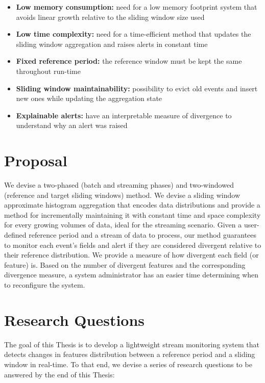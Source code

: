 \begin{itemize}
    \item \textbf{Low memory consumption:} need for a low memory footprint system that avoids linear growth relative to the sliding window size used
    
    \item \textbf{Low time complexity:} need for a time-efficient method that updates the sliding window aggregation and raises alerts in constant time
    
    \item \textbf{Fixed reference period:} the reference window must be kept the same throughout run-time
    
    \item \textbf{Sliding window maintainability:} possibility to evict old events and insert new ones while updating the aggregation state
    
    \item \textbf{Explainable alerts:} have an interpretable measure of divergence to understand why an alert was raised
\end{itemize}


\section{Proposal}
We devise a two-phased (batch and streaming phases) and two-windowed (reference and target sliding windows) method. We devise a sliding window approximate histogram aggregation that encodes data distributions and provide a method for incrementally maintaining it with constant time and space complexity for every growing volumes of data, ideal for the streaming scenario. Given a user-defined reference period and a stream of data to process, our method guarantees to monitor each event's fields and alert if they are considered divergent relative to their reference distribution. We provide a measure of how divergent each field (or feature) is. Based on the number of divergent features and the corresponding divergence measure, a system administrator has an easier time determining when to reconfigure the system.


\section{Research Questions}
The goal of this Thesis is to develop a lightweight stream monitoring system that detects changes in features distribution between a reference period and a sliding window in real-time. To that end, we devise a series of research questions to be answered by the end of this Thesis:

